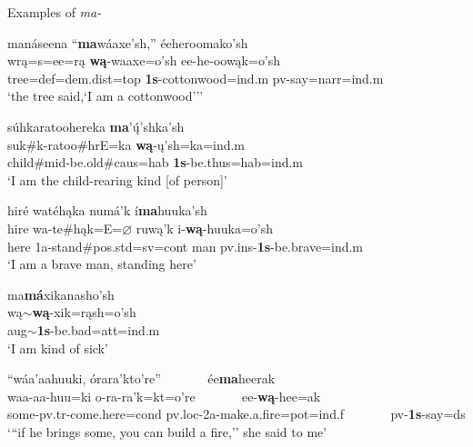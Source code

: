 \begin{exe}

\item\label{MAexamples} Examples of \textit{ma-}

	\begin{xlist}
	
	\item \glll manáseena ``\textbf{ma}wáaxe'sh,'' éeheroomako'sh\\
	wrą=s=ee=rą \textbf{wą}-waaxe=o'sh ee-he-oowąk=o'sh\\
	\textnormal{tree}=def=dem.dist=top \textbf{1s}-\textnormal{cottonwood}=ind.m pv-\textnormal{say}=narr=ind.m\\
	\glt `the tree said,`I am a cottonwood''' \citep[36]{hollow1973a}
	
	\item \glll súhkaratoohereka \textbf{ma}'ų́'shka'sh\\
	suk\#k-ratoo\#hrE=ka \textbf{wą}-ų'sh=ka=ind.m\\
	\textnormal{child}\#mid-\textnormal{be.old}\#caus=hab \textbf{1s}-\textnormal{be.thus}=hab=ind.m\\
	\glt `I am the child-rearing kind [of person]' \citep[113]{hollow1973a}
	
	\item \glll hiré watéhąka numá'k í\textbf{ma}huuka'sh\\
	hire wa-te\#hąk=E=$\varnothing$ ruwą'k i-\textbf{wą}-huuka=o'sh\\
	\textnormal{here} 1a-\textnormal{stand}\#pos.std=sv=cont \textnormal{man} pv.ins-\textbf{1s}-\textnormal{be.brave}=ind.m\\
	\glt `I am a brave man, standing here' \citep[91]{trechter2012b}
	
	\item \glll ma\textbf{má}xikanasho'sh\\
	wą$\sim$\textbf{wą}-xik=rąsh=o'sh\\
	aug$\sim$\textbf{1s}-\textnormal{be.bad}=att=ind.m\\
	\glt `I am kind of sick' \citep[107]{hollow1973b}
	
	\item \glll ``wáa'aahuuki, órara'kto're'' ~ ~ ~ ~  ée\textbf{ma}heerak\\
	waa-aa-huu=ki o-ra-ra'k=kt=o're ~ ~ ~ ~  ee-\textbf{wą}-hee=ak\\
	\textnormal{some}-pv.tr-\textnormal{come.here}=cond pv.loc-2a-\textnormal{make.a.fire}=pot=ind.f ~ ~ ~ ~  pv-\textbf{1s}-\textnormal{say}=ds\\
	\glt `{``}if he brings some, you can build a fire,'' she said to me' \citep[120]{hollow1973a}
	

\end{xlist}
\end{exe}
